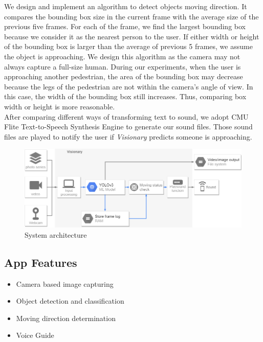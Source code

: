 \documentclass[letterpaper]{article} %
\begin{document}
\noindent We design and implement an algorithm to detect objects moving direction. It compares the bounding box size in the current frame with the average size of the previous five frames. For each of the frame, we find the largest bounding box because we consider it as the nearest person to the user. If either width or height of the bounding box is larger than the average of previous 5 frames, we assume the object is approaching. We design this algorithm as the camera may not always capture a full-size human. During our experiments, when the user is approaching another pedestrian, the area of the bounding box may decrease because the legs of the pedestrian are not within the camera's angle of view. In this case, the width of the bounding box still increases. Thus, comparing box width or height is more reasonable. \\

\noindent After comparing different ways of transforming text to sound, we adopt CMU Flite Text-to-Speech Synthesis Engine to generate our sound files. Those sound files are played to notify the user if \textit{Visionary} predicts someone is approaching. 
\begin{figure}[ht]
\hspace{-6mm}
\centering
\includegraphics[width=1.1\linewidth,height = 0.4\linewidth]{Figure/Code_structure_diagram.png}
\caption{\footnotesize{System architecture}}
\label{fig:arc}
\vspace{-2mm}
\end{figure}

\subsection{App Features}
\begin{itemize}
\item Camera based image capturing
\item Object detection and classification
\item Moving direction determination
\item Voice Guide
\end{itemize}
\end{document}

